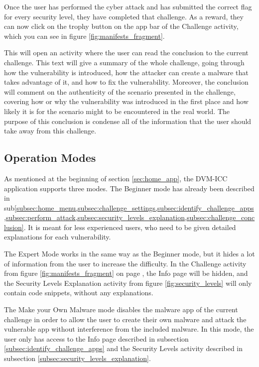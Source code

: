     Once the user has performed the cyber attack and has submitted the correct flag for every security level, they have completed that challenge. As a reward, they can now click on the trophy button on the app bar of the Challenge activity, which you can see in figure \ref{fig:manifests_fragment}.
    
    This will open an activity where the user can read the conclusion to the current challenge. This text will give a summary of the whole challenge, going through how the vulnerability is introduced, how the attacker can create a malware that takes advantage of it, and how to fix the vulnerability. Moreover, the conclusion will comment on the authenticity of the scenario presented in the challenge, covering how or why the vulnerability was introduced in the first place and how likely it is for the scenario might to be encountered in the real world. The purpose of this conclusion is condense all of the information that the user should take away from this challenge.
    
    \subsection{Operation Modes}
        \label{subsec:challenge_modes}
    
    As mentioned at the beginning of section \ref{sec:home_app}, the DVM-ICC application supports three modes. The Beginner mode has already been described in sub\cref{subsec:home_menu,subsec:challenge_settings,subsec:identify_challenge_apps,subsec:perform_attack,subsec:security_levels_explanation,subsec:challenge_conclusion}. It is meant for less experienced users, who need to be given detailed explanations for each vulnerability.
    
    The Expert Mode works in the same way as the Beginner mode, but it hides a lot of information from the user to increase the difficulty. In the Challenge activity from figure \ref{fig:manifests_fragment} on page \pageref{fig:manifests_fragment}, the Info page will be hidden, and the Security Levels Explanation activity from figure \ref{fig:security_levels} will only contain code snippets, without any explanations.
    
    The Make your Own Malware mode disables the malware app of the current challenge in order to allow the user to create their own malware and attack the vulnerable app without interference from the included malware. In this mode, the user only has access to the Info page described in subsection \ref{subsec:identify_challenge_apps} and the Security Levels activity described in subsection \ref{subsec:security_levels_explanation}.
    
